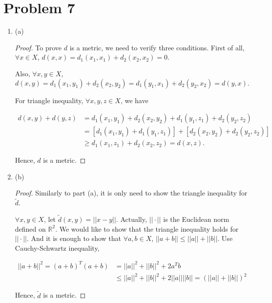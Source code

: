 \documentclass[12pt]{article}
\begin{document}
\section*{Problem 7}
\begin{enumerate}
\item (a)
\begin{proof}
To prove $d$ is a metric, we need to verify three conditions. First of all, $\forall x\in X$, $d(x, x) = d_1(x_1, x_1) + d_2(x_2, x_2) = 0$. 

Also, $\forall x, y \in X$, 
$$
d(x, y) = d_1(x_1, y_1) + d_2(x_2, y_2) = d_1(y_1, x_1) + d_2(y_2, x_2) = d(y, x).
$$

For triangle inequality, $\forall x, y, z \in X$, we have 

$$
\begin{aligned}
d(x, y) + d(y, z) & =  d_1(x_1, y_1) + d_2(x_2, y_2) +  d_1(y_1, z_1) + d_2(y_2, z_2) \\
& = [d_1(x_1, y_1) + d_1(y_1, z_1)] + [d_2(x_2, y_2) +   d_2(y_2, z_2)] \\
& \geqslant d_1(x_1, z_1) + d_2 (x_2, z_2) = d(x, z).
\end{aligned}
$$

Hence, $d$ is a metric.

\end{proof}


\item (b)

\begin{proof}

Similarly to part (a), it is only need to show the triangle inequality for $\tilde d$.

$\forall x, y \in X$, let $\tilde d (x, y) = ||x - y||$. Actually, $||\cdot||$ is the Euclidean norm defined on $\mathbb R^2$. We would like to show that the triangle inequality holds for $||\cdot||$. And it is enough to show that $\forall a, b \in X$, $||a+b|| \leqslant ||a|| + ||b||$. Use Cauchy-Schwartz inequality,

$$
\begin{aligned}
||a + b||^2 = (a + b)^T(a + b) & = ||a||^2 + ||b||^2 + 2a^Tb \\
& \leqslant ||a||^2 + ||b||^2 + 2 ||a||||b|| = (||a||+||b||)^2
\end{aligned}
$$

Hence, $\tilde d $ is a metric.

\end{proof}
\end{enumerate}
\end{document}

